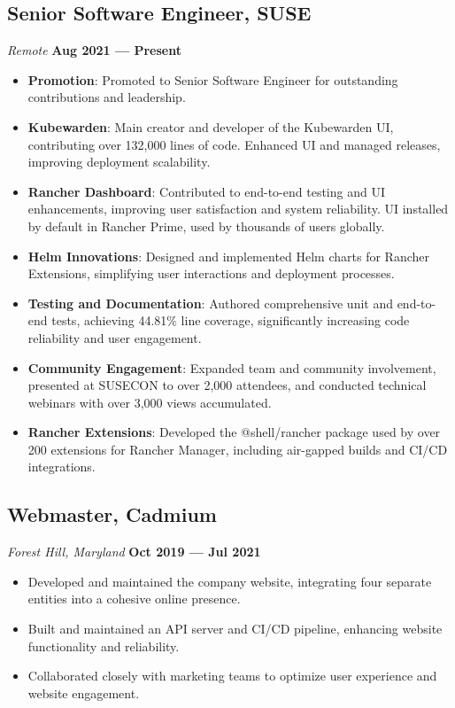 \documentclass[a4paper,10pt]{article}
\begin{document}
\subsection*{Senior Software Engineer, SUSE}
\textit{Remote} \hfill \textbf{Aug 2021 — Present}
\begin{itemize}[leftmargin=1.5em]
    \item \textbf{Promotion}: Promoted to Senior Software Engineer for outstanding contributions and leadership.
    \item \textbf{Kubewarden}: Main creator and developer of the Kubewarden UI, contributing over 132,000 lines of code. Enhanced UI and managed releases, improving deployment scalability.
    \item \textbf{Rancher Dashboard}: Contributed to end-to-end testing and UI enhancements, improving user satisfaction and system reliability. UI installed by default in Rancher Prime, used by thousands of users globally.
    \item \textbf{Helm Innovations}: Designed and implemented Helm charts for Rancher Extensions, simplifying user interactions and deployment processes.
    \item \textbf{Testing and Documentation}: Authored comprehensive unit and end-to-end tests, achieving 44.81\% line coverage, significantly increasing code reliability and user engagement.
    \item \textbf{Community Engagement}: Expanded team and community involvement, presented at SUSECON to over 2,000 attendees, and conducted technical webinars with over 3,000 views accumulated.
    \item \textbf{Rancher Extensions}: Developed the @shell/rancher package used by over 200 extensions for Rancher Manager, including air-gapped builds and CI/CD integrations.
\end{itemize}

\subsection*{Webmaster, Cadmium}
\textit{Forest Hill, Maryland} \hfill \textbf{Oct 2019 — Jul 2021}
\begin{itemize}[leftmargin=1.5em]
    \item Developed and maintained the company website, integrating four separate entities into a cohesive online presence.
    \item Built and maintained an API server and CI/CD pipeline, enhancing website functionality and reliability.
    \item Collaborated closely with marketing teams to optimize user experience and website engagement.
\end{itemize}
\end{document}
